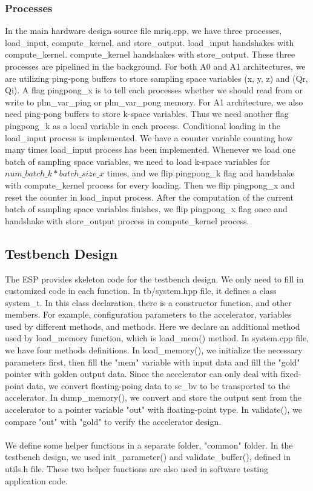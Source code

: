 \subsubsection{Processes}

In the main hardware design source file mriq.cpp, we have three processes,
load\_input, compute\_kernel, and store\_output. load\_input handshakes with
compute\_kernel. compute\_kernel handshakes with store\_output. These three
processes are pipelined in the background. For both A0 and A1 architectures, we
are utilizing ping-pong buffers to store sampling space variables (x, y, z) and
(Qr, Qi). A flag pingpong\_x is to tell each processes whether we should read
from or write to plm\_var\_ping or plm\_var\_pong memory. For A1 architecture,
we also need ping-pong buffers to store k-space variables. Thus we need another
flag pingpong\_k as a local variable in each process. Conditional loading in the
load\_input process is implemented. We have a counter variable counting how many
times load\_input process has been implemented. Whenever we load one batch of
sampling space variables, we need to load k-space variables for $num\_batch\_k *
batch\_size\_x$ times, and we flip pingpong\_k flag and handshake with
compute\_kernel process for every loading. Then we flip pingpong\_x and reset
the counter in load\_input process. After the computation of the current batch
of sampling space variables finishes, we flip pingpong\_x flag once and
handshake with store\_output process in compute\_kernel process. \\

\subsection{Testbench Design}

The ESP provides skeleton code for the testbench design. We only need to fill in
customized code in each function. In tb/system.hpp file, it defines a class
system\_t. In this class declaration, there is a constructor function, and other
members. For example, configuration parameters to the accelerator, variables
used by different methods, and methods. Here we declare an additional method
used by load\_memory function, which is load\_mem() method. In system.cpp file,
we have four methods definitions. In load\_memory(), we initialize the necessary
parameters first, then fill the "mem" variable with input data and fill the
"gold" pointer with golden output data. Since the accelerator can only deal with
fixed-point data, we convert floating-poing data to sc\_bv to be transported to
the accelerator. In dump\_memory(), we convert and store the output sent from
the accelerator to a pointer variable "out" with floating-point type. In
validate(), we compare "out" with "gold" to verify the accelerator
design. \\ \\ We define some helper functions in a separate folder, "common"
folder. In the testbench design, we used init\_parameter() and
validate\_buffer(), defined in utils.h file. These two helper functions are also
used in software testing application code.\\

